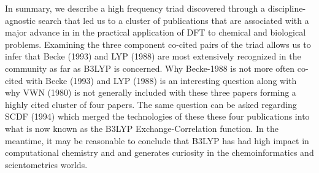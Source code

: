 \documentclass[journal=jcdis8,manuscript=article]{achemso}
\begin{document}
In summary, we describe a high frequency triad discovered through a discipline-agnostic search that led us to a cluster of publications that are associated with a major advance in  in the practical application of DFT to chemical and biological problems. Examining the three component co-cited pairs of the triad allows us to infer that Becke (1993) and LYP (1988) are most extensively recognized in the community as far as B3LYP is concerned. Why Becke-1988 is not more often co-cited with Becke (1993) and LYP (1988) is an interesting question along with why VWN (1980) is not generally included with these three papers forming a highly cited cluster of four papers. The same question can be asked regarding SCDF (1994) which merged the technologies of these these four publications into what is now known as the B3LYP Exchange-Correlation function.   In the meantime, it may be reasonable to conclude that B3LYP has had high impact in computational chemistry and and generates curiosity in the chemoinformatics  and scientometrics worlds.

%

\end{document}
